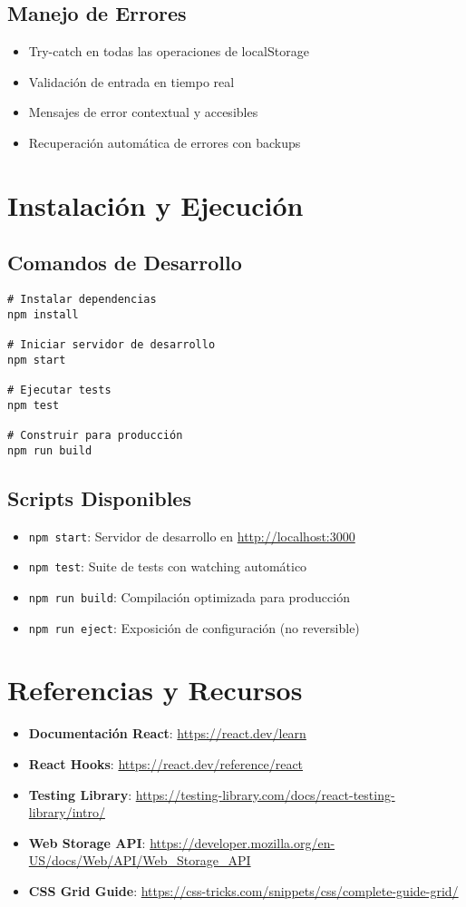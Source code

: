 \documentclass[12pt,a4paper]{article}
\begin{document}
\subsection{Manejo de Errores}
\begin{itemize}
  \item Try-catch en todas las operaciones de localStorage
  \item Validación de entrada en tiempo real
  \item Mensajes de error contextual y accesibles
  \item Recuperación automática de errores con backups
\end{itemize}

\section{Instalación y Ejecución}

\subsection{Comandos de Desarrollo}
\begin{verbatim}
# Instalar dependencias
npm install

# Iniciar servidor de desarrollo
npm start

# Ejecutar tests
npm test

# Construir para producción
npm run build
\end{verbatim}

\subsection{Scripts Disponibles}
\begin{itemize}
  \item \texttt{npm start}: Servidor de desarrollo en \url{http://localhost:3000}
  \item \texttt{npm test}: Suite de tests con watching automático
  \item \texttt{npm run build}: Compilación optimizada para producción
  \item \texttt{npm run eject}: Exposición de configuración (no reversible)
\end{itemize}

\section{Referencias y Recursos}

\begin{itemize}
  \item \textbf{Documentación React}: \url{https://react.dev/learn}
  \item \textbf{React Hooks}: \url{https://react.dev/reference/react}
  \item \textbf{Testing Library}: \url{https://testing-library.com/docs/react-testing-library/intro/}
  \item \textbf{Web Storage API}: \url{https://developer.mozilla.org/en-US/docs/Web/API/Web_Storage_API}
  \item \textbf{CSS Grid Guide}: \url{https://css-tricks.com/snippets/css/complete-guide-grid/}
\end{itemize}
\end{document}
